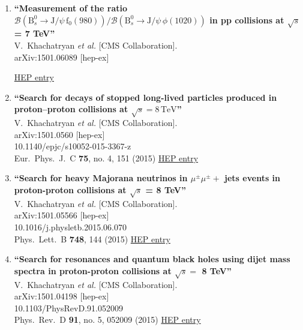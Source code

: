 \documentclass{article}
\begin{document}
\begin{enumerate}
\item%
{\bf ``Measurement of the ratio $\mathcal{B}( \mathrm{B}^0_{s} \to \mathrm{J}/\psi\, \mathrm{f}_0(980))/\mathcal{B}(\mathrm{B}^0_{s} \to \mathrm{J}/\psi\, \phi(1020))$ in pp collisions at $\sqrt{s}$ = 7 TeV''}
  \\{}V.~Khachatryan {\it et al.} [CMS Collaboration].
  \\{}arXiv:1501.06089 [hep-ex]
  
\href{http://inspirehep.net/record/1341039}{HEP entry}



\item%
{\bf ``Search for decays of stopped long-lived particles produced in proton–proton collisions at $\sqrt{s}= 8\,\text {TeV} $''}
  \\{}V.~Khachatryan {\it et al.} [CMS Collaboration].
  \\{}arXiv:1501.0560 [hep-ex]
    \\{}10.1140/epjc/s10052-015-3367-z
\\{}Eur.\ Phys.\ J.\ C {\bf 75}, no. 4, 151 (2015) %
\href{http://inspirehep.net/record/1340699}{HEP entry}


\item%
{\bf ``Search for heavy Majorana neutrinos in $\mu^\pm \mu^\pm+$ jets events in proton-proton collisions at $\sqrt{s}$ = 8 TeV''}
  \\{}V.~Khachatryan {\it et al.} [CMS Collaboration].
  \\{}arXiv:1501.05566 [hep-ex]
    \\{}10.1016/j.physletb.2015.06.070
\\{}Phys.\ Lett.\ B {\bf 748}, 144 (2015) %
\href{http://inspirehep.net/record/1340696}{HEP entry}


\item%
{\bf ``Search for resonances and quantum black holes using dijet mass spectra in proton-proton collisions at $\sqrt{s} =$ 8 TeV''}
  \\{}V.~Khachatryan {\it et al.} [CMS Collaboration].
  \\{}arXiv:1501.04198 [hep-ex]
    \\{}10.1103/PhysRevD.91.052009
\\{}Phys.\ Rev.\ D {\bf 91}, no. 5, 052009 (2015) %
\href{http://inspirehep.net/record/1340084}{HEP entry}



\end{enumerate}
\end{document}
